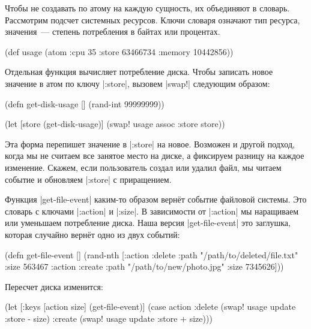 Чтобы не создавать по атому на каждую сущность, их объединяют в
словарь. Рассмотрим подсчет системных ресурсов. Ключи словаря означают тип
ресурса, значения~--- степень потребления в байтах или процентах.

\begin{english}
  \begin{clojure}
(def usage
  (atom {:cpu 35
         :store 63466734
         :memory 10442856}))
  \end{clojure}
\end{english}

Отдельная функция вычисляет потребление диска. Чтобы записать новое значение в
атом по ключу \spverb|:store|, вызовем \spverb|swap!| следующим образом:

\begin{english}
  \begin{clojure}
(defn get-disk-usage []
  (rand-int 99999999))

(let [store (get-disk-usage)]
  (swap! usage assoc :store store))
  \end{clojure}
\end{english}

Эта форма перепишет значение в \spverb|:store| на новое. Возможен и другой
подход, когда мы не считаем все занятое место на диске, а фиксируем разницу на
каждое изменение. Скажем, если пользователь создал или удалил файл, мы читаем
событие и обновляем \spverb|:store| с приращением.

Функция \spverb|get-file-event| каким-то образом верн\"{е}т событие файловой
системы. Это словарь с ключами \spverb|:action| и \spverb|:size|. В зависимости
от \spverb|:action| мы наращиваем или уменьшаем потребление диска. Наша версия
\spverb|get-file-event| это заглушка, которая случайно верн\"{е}т одно из двух
событий:

\begin{english}
  \begin{clojure}
(defn get-file-event []
  (rand-nth
   [{:action :delete
     :path "/path/to/deleted/file.txt"
     :size 563467}
    {:action :create
     :path "/path/to/new/photo.jpg"
     :size 7345626}]))
  \end{clojure}
\end{english}

\noindent
Пересчет диска изменится:

\begin{english}
  \begin{clojure}
(let [{:keys [action size]} (get-file-event)]
  (case action
    :delete
    (swap! usage update :store - size)
    :create
    (swap! usage update :store + size)))
  \end{clojure}
\end{english}

